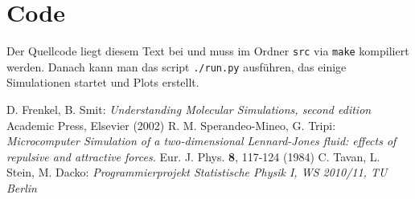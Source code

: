 \documentclass[11pt,a4paper]{article}
\begin{document}
% 
% 
% 
% 


\section{Code} %
\label{sec:code}
Der Quellcode liegt diesem Text bei und muss im Ordner \texttt{src} via \texttt{make} kompiliert werden. Danach kann man das script \texttt{./run.py} ausführen, das einige Simulationen startet und Plots erstellt.


%  
% 
\begin{thebibliography}{xx}
	 D. Frenkel, B. Smit: \emph{Understanding Molecular Simulations, second edition} Academic Press, Elsevier (2002)
	 R. M. Sperandeo-Mineo, G. Tripi: \emph{Microcomputer Simulation of a two-dimensional Lennard-Jones fluid: effects of repulsive and attractive forces.} Eur. J. Phys. \textbf{8}, 117-124 (1984)
	 C. Tavan, L. Stein, M. Dacko: \emph{Programmierprojekt Statistische Physik I, WS 2010/11, TU Berlin}
\end{thebibliography}
\end{document}
